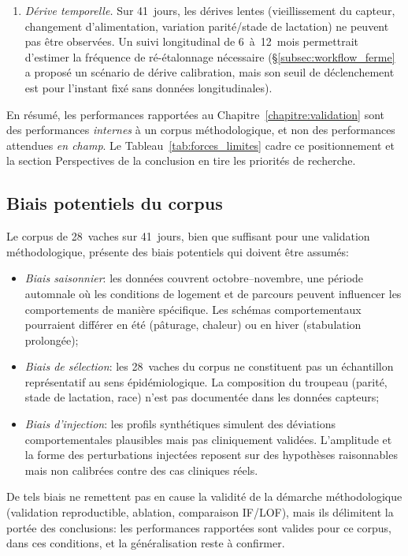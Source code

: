 \begin{enumerate}
    \item \textit{Dérive temporelle.} Sur 41~jours, les dérives lentes
    (vieillissement du capteur, changement d'alimentation, variation
    parité/stade de lactation) ne peuvent pas être observées. Un suivi
    longitudinal de 6~à~12~mois permettrait d'estimer la fréquence de
    ré-étalonnage nécessaire (\S\ref{subsec:workflow_ferme} a proposé
    un scénario de dérive calibration, mais son seuil de déclenchement
    est pour l'instant fixé sans données longitudinales).
\end{enumerate}

En résumé, les performances rapportées au
Chapitre~\ref{chapitre:validation} sont des performances
\textit{internes} à un corpus méthodologique, et non des performances
attendues \textit{en champ}. Le Tableau~\ref{tab:forces_limites} cadre
ce positionnement et la section \og Perspectives \fg{} de la
conclusion en tire les priorités de recherche.

\subsection{Biais potentiels du corpus}
Le corpus de 28~vaches sur 41~jours, bien que suffisant pour une validation méthodologique,
présente des biais potentiels qui doivent être assumés:
\begin{itemize}
    \item \textit{Biais saisonnier}: les données couvrent octobre--novembre, une période
    automnale où les conditions de logement et de parcours peuvent influencer les
    comportements de manière spécifique. Les schémas comportementaux pourraient
    différer en été (pâturage, chaleur) ou en hiver (stabulation prolongée);
    \item \textit{Biais de sélection}: les 28~vaches du corpus ne constituent pas un
    échantillon représentatif au sens épidémiologique. La composition du troupeau
    (parité, stade de lactation, race) n'est pas documentée dans les données capteurs;
    \item \textit{Biais d'injection}: les profils synthétiques simulent des déviations
    comportementales plausibles mais pas cliniquement validées. L'amplitude et la forme
    des perturbations injectées reposent sur des hypothèses raisonnables mais non
    calibrées contre des cas cliniques réels.
\end{itemize}

De tels biais ne remettent pas en cause la validité de la démarche méthodologique
(validation reproductible, ablation, comparaison IF/LOF), mais ils délimitent la portée
des conclusions: les performances rapportées sont valides pour ce corpus, dans ces
conditions, et la généralisation reste à confirmer.

